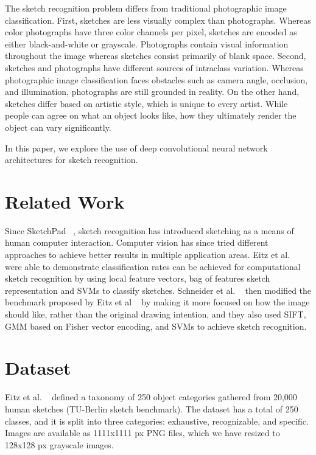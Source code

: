 \documentclass[10pt,twocolumn,letterpaper]{article}
\begin{document}
The sketch recognition problem differs from traditional photographic image classification. First, sketches are less visually complex than photographs. Whereas color photographs have three color channels per pixel, sketches are encoded as either black-and-white or grayscale. Photographs contain visual information throughout the image whereas sketches consist primarily of blank space. Second, sketches and photographs have different sources of intraclass variation. Whereas photographic image classification faces obstacles such as camera angle, occlusion, and illumination, photographs are still grounded in reality. On the other hand, sketches differ based on artistic style, which is unique to every artist. While people can agree on what an object looks like, how they ultimately render the object can vary significantly.

In this paper, we explore the use of deep convolutional neural network architectures for sketch recognition.

\section{Related Work}
Since SketchPad ~\cite{sutherland1964sketchpad}, sketch recognition has introduced sketching as a means of human computer interaction. Computer vision has since tried different approaches to achieve better results in multiple application areas. Eitz et al. ~\cite{eitz2012hdhso} were able to demonstrate classification rates can be achieved for computational sketch recognition by using local feature vectors, bag of features sketch representation and SVMs to classify sketches. Schneider et al. ~\cite{schneider2014sketch} then modified the benchmark proposed by Eitz et al ~\cite{eitz2012hdhso} by making it more focused on how the image should like, rather than the original drawing intention, and they also used SIFT, GMM based on Fisher vector encoding, and SVMs to achieve sketch recognition. 




\section{Dataset}
Eitz et al. ~\cite{eitz2012hdhso} defined a taxonomy of 250 object categories gathered from 20,000 human sketches (TU-Berlin sketch benchmark). The dataset has a total of 250 classes, and it is split into three categories: exhaustive, recognizable, and specific. Images are available as 1111x1111 px PNG files, which we have resized to 128x128 px grayscale images.
\end{document}
